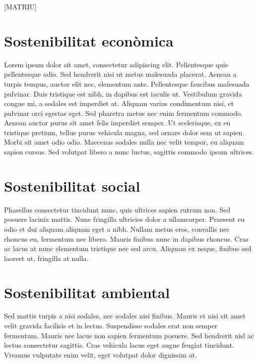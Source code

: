 [MATRIU]

\section{Sostenibilitat econòmica}
	Lorem ipsum dolor sit amet, consectetur adipiscing elit. Pellentesque quis pellentesque odio. Sed hendrerit nisi ut metus malesuada placerat. Aenean a turpis tempus, auctor elit nec, elementum ante. Pellentesque faucibus malesuada pulvinar. Duis tristique est nibh, in dapibus est iaculis ut. Vestibulum gravida congue mi, a sodales est imperdiet at. Aliquam varius condimentum nisi, et pulvinar orci egestas eget. Sed pharetra metus nec enim fermentum commodo. Aenean auctor purus sit amet felis imperdiet semper. Ut scelerisque, ex eu tristique pretium, tellus purus vehicula magna, sed ornare dolor sem ut sapien. Morbi sit amet odio odio. Maecenas sodales nulla nec velit tempor, eu aliquam sapien cursus. Sed volutpat libero a nunc luctus, sagittis commodo ipsum ultrices.

\section{Sostenibilitat social}
	Phasellus consectetur tincidunt nunc, quis ultrices sapien rutrum non. Sed posuere lacinia mattis. Nunc fringilla ultricies dolor a ullamcorper. Praesent eu odio et dui aliquam aliquam eget a nibh. Nullam metus eros, convallis nec rhoncus eu, fermentum nec libero. Mauris finibus nunc in dapibus rhoncus. Cras ac lacus at nunc elementum tristique nec sed arcu. Aliquam ex neque, finibus sed laoreet ut, fringilla at nulla. 

\section{Sostenibilitat ambiental}
	Sed mattis turpis a nisi sodales, nec sodales nisi finibus. Mauris et nisi sit amet velit gravida facilisis et in lectus. Suspendisse sodales erat non semper fermentum. Mauris nec lacus non sapien fermentum posuere. Sed hendrerit nisl ac lectus consectetur sagittis. Cras vehicula lacus eget augue feugiat tincidunt. Vivamus vulputate enim velit, eget volutpat dolor dignissim at. 
